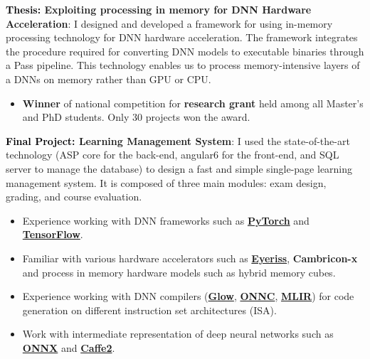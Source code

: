 \documentclass[10pt,a4paper,ragged2e,withhyper]{files/altacv}
\begin{document}
\begin{paracol}{2}


    \textbf{\textcolor{3}{Thesis:} Exploiting processing in memory for DNN Hardware Acceleration}: I designed and developed a framework for using in-memory processing technology for DNN hardware acceleration. The framework integrates the procedure required for converting DNN models to executable binaries through a Pass pipeline. This technology enables us to process memory-intensive layers of a DNNs on memory rather than GPU or CPU.
    
    \newline 
\begin{itemize}    
    \item \textbf{Winner} of national competition for \textbf{research grant} held among all Master's and PhD students. Only 30 projects won the award.
    
\end{itemize}
\divider


    \textbf{\textcolor{3}{Final Project:} Learning Management System}: I used the state-of-the-art technology (ASP core for the back-end, angular6 for the front-end, and SQL server to manage the database) to design a fast and simple single-page learning management system. It is composed of three main modules: exam design, grading, and course evaluation.



\begin{itemize}
\item  Experience working with DNN frameworks such as \href{https://pytorch.org/}{\textbf{PyTorch}} and \href{https://www.tensorflow.org/}{\textbf{TensorFlow}}.
\item Familiar with various hardware accelerators such as \href{https://eyeriss.mit.edu/}{\textbf{Eyeriss}}, \textbf{Cambricon-x} and process in memory hardware models such as hybrid memory cubes. 
\item Experience working with DNN compilers (\href{https://ai.facebook.com/tools/glow/}{\textbf{Glow}}, \href{https://onnc.ai/}{\textbf{ONNC}}, \href{https://mlir.llvm.org/}{\textbf{MLIR}}) for code generation on different instruction set architectures (ISA).
\item  Work with intermediate representation of deep neural networks such as \href{https://onnc.ai/}{\textbf{ONNX}} and \href{https://caffe2.ai/}{\textbf{Caffe2}}.
\end{itemize}


\end{paracol}
\end{document}
